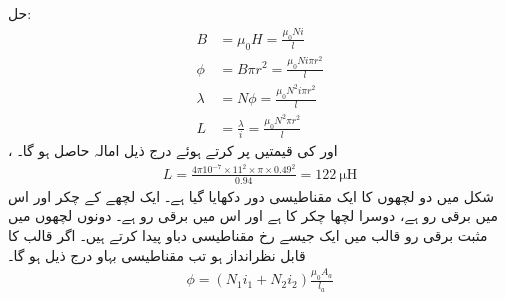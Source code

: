 حل:
\begin{align*}
B&=\mu_0 H=\frac{\mu_0 N i}{l}\\
\phi&=B  \pi r^2=\frac{\mu_0 N i \pi r^2}{l}\\ 
\lambda&=N \phi =\frac{\mu_0 N^2 i \pi r^2}{l}\\ 
L&=\frac{\lambda}{i}=\frac{\mu_0 N^2 \pi r^2}{l}
\end{align*} 
،  اور  کی قیمتیں پر کرتے ہوئے درج ذیل امالہ حاصل ہو گا۔
\begin{align*}
L=\frac{4 \pi 10^{-7} \times 11^2 \times \pi  \times 0.49^2}{0.94}=\SI{122}{\micro \henry}
\end{align*}
%
شکل  میں دو لچھوں کا ایک مقناطیسی دور دکھایا گیا ہے۔ ایک لچھے کے چکر    اور اس میں برقی رو  ہے،  دوسرا لچھا  چکر کا ہے اور اس میں برقی  رو  ہے۔ دونوں لچھوں میں مثبت برقی رو قالب میں ایک جیسے  رخ  مقناطیسی دباو  پیدا کرتے ہیں۔ اگر قالب کا  قابل نظرانداز ہو تب مقناطیسی بہاو درج ذیل ہو گا۔
\begin{align}
\phi=\left (N_1 i_1 +N_2 i_2 \right ) \frac{\mu_0 A_a}{l_a}
\end{align} 
%
